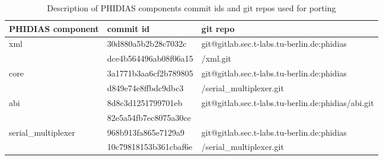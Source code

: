 \begin{table}[!htbp]
	\centering
	\begin{tabular}[t]{|C{3cm}|C{4cm}  |C{4cm}|}
		\hline
		PHIDIAS component & commit id & git repo \\
		\hline
		xml &  30d880a5b2b28c7032c & git@gitlab.sec.t-labs.tu-berlin.de:phidias\\
		& dce4b564496ab08f06a15 &/xml.git \\
		\hline
		core & 3a1771b3aa6cf2b789805 & git@gitlab.sec.t-labs.tu-berlin.de:phidias\\
		& d849e74e8ffbdc9dbc3 & /serial\_multiplexer.git \\
		\hline
		abi &  8d8c3d1251799701eb& git@gitlab.sec.t-labs.tu-berlin.de:phidias/abi.git\\
		& 82e5a54fb7ec8075a30ce & \\
		\hline
		serial\_multiplexer & 968b913fa865e7129a9 & git@gitlab.sec.t-labs.tu-berlin.de:phidias \\
		& 10c79818153b361cbaf6e & /serial\_multiplexer.git\\
		\hline
	\end{tabular}
	\caption{Description of PHIDIAS components commit ids and git repos used for porting}
	\label{PHIDIAS_comp}
\end{table}

